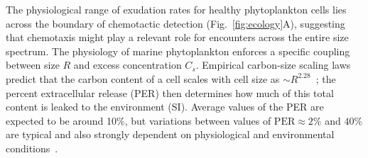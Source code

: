 \documentclass[9pt,twocolumn,twoside]{pnas-new}
\providecommand{\DIFdelbegin}{} %
\providecommand{\DIFdelend}{} %
\begin{document}
\DIFdelbegin %

\DIFdelend The physiological range of exudation rates for healthy phytoplankton cells lies across the boundary of chemotactic detection (Fig.~\ref{fig:ecology}A), suggesting that chemotaxis might play a relevant role for encounters across the entire size spectrum. The physiology of marine phytoplankton enforces a specific coupling between size $R$ and excess concentration $C_s$.
Empirical carbon-size scaling laws predict that the carbon content of a cell scales with cell size as $\sim R^{2.28}$~\cite{mullin1966relationship}; the percent extracellular release (PER) then determines how much of this total content is leaked to the environment (SI).
Average values of the PER are expected to be around 10\%, but variations between values of $\mathrm{PER}\approx 2\%$ and $40\%$ are typical and also strongly dependent on physiological and environmental conditions~\cite{maranon2004significance}.
\end{document}
